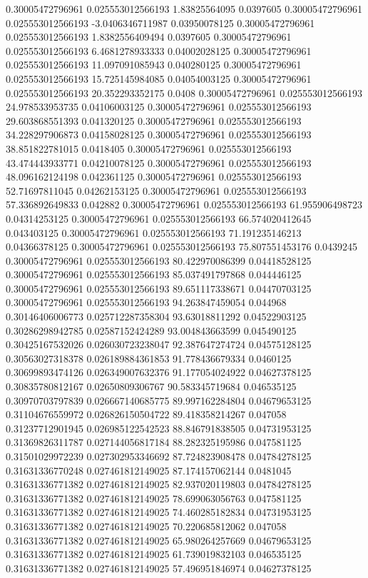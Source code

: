 0.30005472796961 0.025553012566193 1.83825564095 0.0397605
0.30005472796961 0.025553012566193 -3.0406346711987 0.03950078125
0.30005472796961 0.025553012566193 1.8382556409494 0.0397605
0.30005472796961 0.025553012566193 6.4681278933333 0.04002028125
0.30005472796961 0.025553012566193 11.097091085943 0.040280125
0.30005472796961 0.025553012566193 15.725145984085 0.04054003125
0.30005472796961 0.025553012566193 20.352293352175 0.0408
0.30005472796961 0.025553012566193 24.978533953735 0.04106003125
0.30005472796961 0.025553012566193 29.603868551393 0.041320125
0.30005472796961 0.025553012566193 34.228297906873 0.04158028125
0.30005472796961 0.025553012566193 38.851822781015 0.0418405
0.30005472796961 0.025553012566193 43.474443933771 0.04210078125
0.30005472796961 0.025553012566193 48.096162124198 0.042361125
0.30005472796961 0.025553012566193 52.71697811045 0.04262153125
0.30005472796961 0.025553012566193 57.336892649833 0.042882
0.30005472796961 0.025553012566193 61.955906498723 0.04314253125
0.30005472796961 0.025553012566193 66.574020412645 0.043403125
0.30005472796961 0.025553012566193 71.191235146213 0.04366378125
0.30005472796961 0.025553012566193 75.807551453176 0.0439245
0.30005472796961 0.025553012566193 80.422970086399 0.04418528125
0.30005472796961 0.025553012566193 85.037491797868 0.044446125
0.30005472796961 0.025553012566193 89.651117338671 0.04470703125
0.30005472796961 0.025553012566193 94.263847459054 0.044968
0.30146406006773 0.025712287358304 93.63018811292 0.04522903125
0.30286298942785 0.02587152424289 93.004843663599 0.045490125
0.30425167532026 0.026030723238047 92.387647274724 0.04575128125
0.30563027318378 0.026189884361853 91.778436679334 0.0460125
0.30699893474126 0.026349007632376 91.177054024922 0.04627378125
0.30835780812167 0.02650809306767 90.583345719684 0.046535125
0.30970703797839 0.026667140685775 89.997162284804 0.04679653125
0.31104676559972 0.026826150504722 89.418358214267 0.047058
0.31237712901945 0.026985122542523 88.846791838505 0.04731953125
0.31369826311787 0.027144056817184 88.282325195986 0.047581125
0.31501029972239 0.027302953346692 87.724823908478 0.04784278125
0.31631336770248 0.027461812149025 87.174157062144 0.0481045
0.31631336771382 0.027461812149025 82.937020119803 0.04784278125
0.31631336771382 0.027461812149025 78.699063056763 0.047581125
0.31631336771382 0.027461812149025 74.460285182834 0.04731953125
0.31631336771382 0.027461812149025 70.220685812062 0.047058
0.31631336771382 0.027461812149025 65.980264257669 0.04679653125
0.31631336771382 0.027461812149025 61.739019832103 0.046535125
0.31631336771382 0.027461812149025 57.496951846974 0.04627378125
